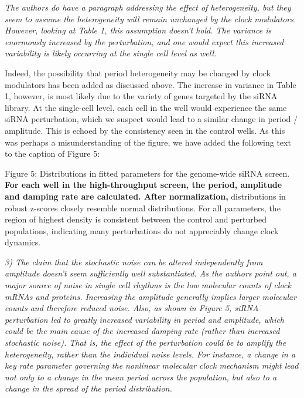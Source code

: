 \documentclass[11pt, letterpaper]{article}
\newenvironment{reviewer}{\itshape\color{gray}}{}
\newenvironment{manuscript}[1]{\begin{center}\begin{tcolorbox}[colback=green!5!white,colframe=green!75!black,width=\textwidth,title={#1},breakable,fonttitle=\bfseries]}{\end{tcolorbox}\end{center}}
\begin{document}
\begin{reviewer}
The authors do have a paragraph addressing the effect of heterogeneity, but they seem to assume the heterogeneity will remain unchanged by the clock modulators. However, looking at Table 1, this assumption doesn't hold. The variance is enormously increased by the perturbation, and one would expect this increased variability is likely occurring at the single cell level as well.
\end{reviewer}

Indeed, the possibility that period heterogeneity may be changed by clock modulators has been added as discussed above.
The increase in variance in Table 1, however, is most likely due to the variety of genes targeted by the siRNA library.
At the single-cell level, each cell in the well would experience the same siRNA perturbation, which we suspect would lead to a similar change in period / amplitude. This is echoed by the consistency seen in the control wells.
As this was perhaps a misunderstanding of the figure, we have added the following text to the caption of Figure 5:

\begin{manuscript}{Page 7}
  Figure 5: Distributions in fitted parameters for the genome-wide siRNA screen. {\bfseries For each well in the high-throughput screen, the period, amplitude and damping rate are calculated. After normalization,} distributions in robust z-scores closely resemble normal distributions. For all parameters, the region of highest density is consistent between the control and perturbed populations, indicating many perturbations do not appreciably change clock dynamics. 
\end{manuscript}

\begin{reviewer}
3) The claim that the stochastic noise can be altered independently from amplitude doesn't seem sufficiently well substantiated. As the authors point out, a major source of noise in single cell rhythms is the low molecular counts of clock mRNAs and proteins. Increasing the amplitude generally implies larger molecular counts and therefore reduced noise. Also, as shown in Figure 5, siRNA perturbation led to greatly increased variability in period and amplitude, which could be the main cause of the increased damping rate (rather than increased stochastic noise). That is, the effect of the perturbation could be to amplify the heterogeneity, rather than the individual noise levels. For instance, a change in a key rate parameter governing the nonlinear molecular clock mechanism might lead not only to a change in the mean period across the population, but also to a change in the spread of the period distribution. 
\end{reviewer}
\end{document}

